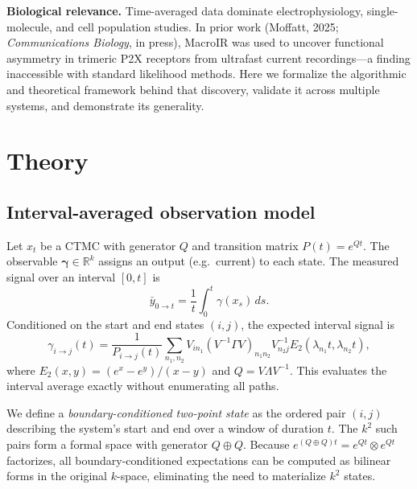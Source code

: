 \documentclass[9pt]{elife}
\begin{document}
\textbf{Biological relevance.} Time-averaged data dominate electrophysiology, single-molecule, and cell population studies. In prior work (Moffatt, 2025; \emph{Communications Biology}, in press), MacroIR was used to uncover functional asymmetry in trimeric P2X receptors from ultrafast current recordings---a finding inaccessible with standard likelihood methods. Here we formalize the algorithmic and theoretical framework behind that discovery, validate it across multiple systems, and demonstrate its generality.


\section*{Theory}
\subsection*{Interval-averaged observation model}
Let $x_t$ be a CTMC with generator $Q$ and transition matrix $P(t)=e^{Qt}$. The observable $\bm{\gamma}\in\mathbb{R}^k$ assigns an output (e.g.\ current) to each state. The measured signal over an interval $[0,t]$ is
\begin{equation}
\bar y_{0\to t} = \frac{1}{t}\int_0^t \gamma(x_s)\,ds.
\end{equation}
Conditioned on the start and end states $(i,j)$, the expected interval signal is
\begin{equation}
\gamma_{i\to j}(t) = \frac{1}{P_{i\to j}(t)} \sum_{n_1,n_2} V_{i n_1}(V^{-1}\Gamma V)_{n_1 n_2}V^{-1}_{n_2 j}E_2(\lambda_{n_1} t, \lambda_{n_2} t),
\end{equation}
where $E_2(x,y)=(e^{x}-e^{y})/(x-y)$ and $Q=V\Lambda V^{-1}$. This evaluates the interval average exactly without enumerating all paths.

\begin{tcolorbox}[colback=gray!5,colframe=gray!60,title=Boundary-conditioned two-point states (``meta-states'')]
We define a \emph{boundary-conditioned two-point state} as the ordered pair $(i,j)$ describing the system’s start and end over a window of duration $t$. The $k^2$ such pairs form a formal space with generator $Q\oplus Q$. Because $e^{(Q\oplus Q)t}=e^{Qt}\otimes e^{Qt}$ factorizes, all boundary-conditioned expectations can be computed as bilinear forms in the original $k$-space, eliminating the need to materialize $k^2$ states.
\end{tcolorbox}
\end{document}

